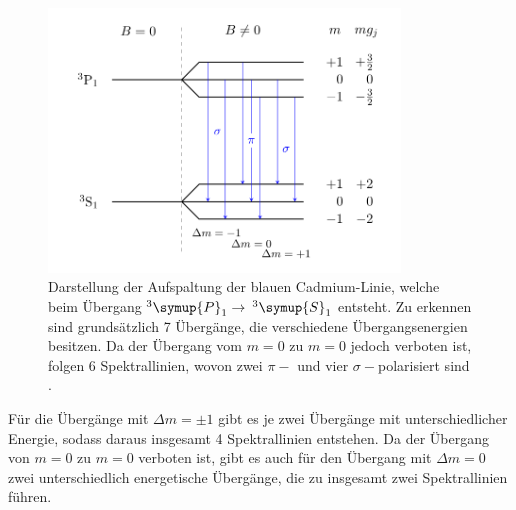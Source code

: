                 \begin{figure}
                    \centering
                    \includegraphics[height=7cm]{blau.png}
                    \caption{Darstellung der Aufspaltung der blauen Cadmium-Linie, welche beim Übergang 
                    $^{3}\symup{P}_1 \to$\,\,$^{3}\symup{S}_1$ entsteht. Zu erkennen sind grundsätzlich 7 Übergänge,
                    die verschiedene Übergangsenergien besitzen. Da der Übergang vom $m=0$ zu $m=0$ jedoch verboten ist, folgen 
                    6 Spektrallinien, wovon zwei $\pi-$ und vier $\sigma-$polarisiert sind \cite{josh}.}
                    \label{fig:blau}
                \end{figure}
               
               Für die Übergänge mit $\Delta m = \pm 1$ gibt es je 
               zwei Übergänge mit unterschiedlicher Energie, sodass daraus insgesamt 4 Spektrallinien entstehen. 
               Da der Übergang von $m=0$ zu $m=0$ verboten ist, gibt es auch für den Übergang mit
               $\Delta m  = 0$ zwei unterschiedlich energetische Übergänge, die zu insgesamt zwei 
               Spektrallinien führen. 
